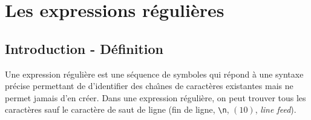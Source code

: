 %
%

\setcounter{remarque-cnt}{1}
\setcounter{example-cnt}{1}
\chapter{\label{reg-exp}Les expressions r{\'e}guli{\`e}res}
\thispagestyle{fancy}

\section{Introduction - D{\'e}finition}

Une expression r{\'e}guli{\`e}re est
une s{\'e}quence de symboles qui r{\'e}pond {\`a} une syntaxe
pr{\'e}cise permettant de d'identifier des cha{\^\i}nes de
caract{\`e}res existantes mais ne permet jamais d'en cr{\'e}er. Dans une
expression r{\'e}guli{\`e}re, on peut trouver tous les caract{\`e}res
sauf le caract{\`e}re de saut de ligne (fin de ligne, \verb=\n=,
{\ASCII}$(10)$, \textsl{line feed}).


